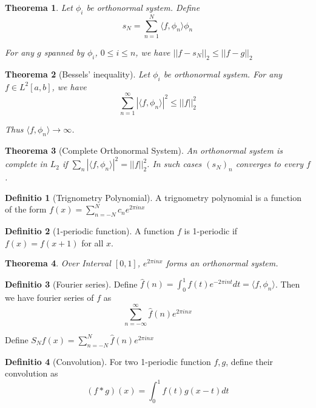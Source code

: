\documentclass[12pt, a4paper]{article}
\newtheorem{theorem}{Theorema}
\theoremstyle{definition}
\newtheorem{definition}{Definitio}
\theoremstyle{remark}
\begin{document}
\begin{theorem}
	Let $\phi_i$ be orthonormal system. Define 
	$$
	s_N = \sum_{n=1}^{N} \langle f, \phi_n \rangle \phi_n
	$$

	For any $g$ spanned by $\phi_i$, $0 \leq i \leq n$, we have $||f - s_N||_2 \leq ||f - g||_2$
\end{theorem}

\begin{theorem}[Bessels' inequality]
	Let $\phi_i$ be orthonormal system. For any $f \in L^2[a,b]$, we have
	$$
	\sum_{n=1}^{\infty} |\langle f, \phi_n \rangle|^2 \leq ||f||_2^2
	$$

	Thus $\langle f, \phi_n \rangle \rightarrow  \infty$.
\end{theorem}

\begin{theorem}[Complete Orthonormal System]
	An orthonormal system is complete in $L_2$ if $\sum_n |\langle f, \phi_n \rangle |^2 = ||f||^2_2$. In such cases $(s_N)_n$ converges to every $f$.
\end{theorem}

\begin{definition}[Trignometry Polynomial]
	A trignometry polynomial is a function of the form $f(x) = \sum _{n = -N}^{N} c_n e^{2\pi in x}$
\end{definition}

\begin{definition}[1-periodic function]
	A function $f$ is 1-periodic if $f(x) = f(x+1)$ for all $x$.
\end{definition}

\begin{theorem}
	Over Interval $[0,1]$, $e^{2\pi i nx}$ forms an orthonormal system.
\end{theorem}

\begin{definition}[Fourier series]
	Define $\hat{f}(n) = \int _0^1 f(t) e^{ - 2 \pi in t}dt = \langle f, \phi_n \rangle$. Then we have fourier series of $f$ as
	$$
	\sum_{n = -\infty}^{\infty} \hat{f}(n) e^{2\pi in x}
	$$

	Define $S_N f(x) = \sum _{n = -N}^{N} \hat{f}(n) e^{2\pi inx}$
\end{definition}

\begin{definition}[Convolution]
	For two 1-periodic function $f, g$, define their convolution as
	$$
	(f*g)(x) = \int _0^1 f(t)g(x-t)dt
	$$
\end{definition}
\end{document}
